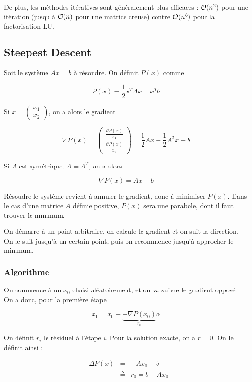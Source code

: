 De plus, les méthodes itératives sont généralement plus efficaces : $\mathcal{O}(n^2)$ pour une itération (jusqu'à $\mathcal{O}(n)$ pour une matrice creuse) contre $\mathcal{O}(n^3)$ pour la factorisation LU.


	\subsection{Steepest Descent}	
	
	Soit le système $Ax = b$ à résoudre. On définit $P(x)$ comme
	
	$$P(x) = \frac{1}{2}x^T A x -x^Tb$$
	
	Si $x = \begin{pmatrix}
x_1 \\ 
x_2
\end{pmatrix}$, on a alors le gradient
	
	$$\nabla P(x) = \begin{pmatrix}
\frac{\vartheta P(x)}{x_1} \\ 
\frac{\vartheta P(x)}{x_2}
\end{pmatrix} = \frac{1}{2} Ax + \frac{1}{2} A^Tx - b$$

	Si $A$ est symétrique, $A = A^T$, on a alors
	
	$$\nabla P(x) = Ax - b$$
	
	Résoudre le système revient à annuler le gradient, donc à minimiser $P(x)$. Dans le cas d'une matrice $A$ définie positive, $P(x)$ sera une parabole, dont il faut trouver le minimum.
	
		
	
	On démarre à un point arbitraire, on calcule le gradient et on suit la direction. On le suit jusqu'à un certain point, puis on recommence jusqu'à approcher le minimum.

	
	\subsubsection{Algorithme}
	
	On commence à un $x_0$ choisi aléatoirement, et on va suivre le gradient opposé. On a donc, pour la première étape 
	
	$$x_1 = x_0 + \underbrace{- \nabla P(x_0)}_{r_0} \alpha$$
	
	On définit $r_i$ le résiduel à l'étape $i$. Pour la solution exacte, on a $r = 0$. On le définit ainsi :
		
	\begin{eqnarray}
	- \Delta P(x) & = & -Ax_0 + b \\
	 & \triangleq & r_0 = b - Ax_0
	\end{eqnarray}
	
